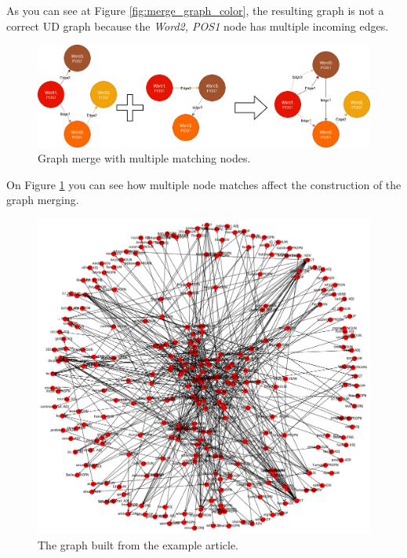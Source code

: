 As you can see at Figure \ref{fig:merge_graph_color}, the resulting graph is not a correct UD graph because the \textit{Word2, POS1} node has multiple incoming edges.

\begin{figure}[!ht]
	\centering
	\includegraphics[width=150mm, keepaspectratio]{figures/merge_graphs_color_multiple.png}
	\caption{Graph merge with multiple matching nodes.}
	\label{fig:merge_graph_color_multiple}
\end{figure}

On Figure \ref{fig:merge_graph_color_multiple} you can see how multiple node matches affect the construction of the graph merging.

\begin{figure}[!ht]
	\centering
	\includegraphics[width=150mm, keepaspectratio]{figures/usain_bolt_article.png}
	\caption{The graph built from the example article.}
	\label{fig:usain_article_graph}
\end{figure}

